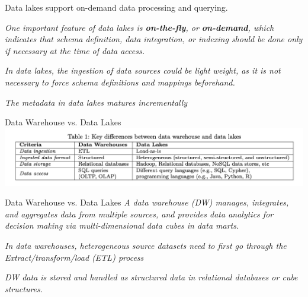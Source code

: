 \documentclass[xcolor=x11names,compress, 24pt]{beamer}
\renewcommand{\(}{\begin{columns}}
\renewcommand{\)}{\end{columns}}
\newcommand{\<}[1]{\begin{column}{#1}}
\renewcommand{\>}{\end{column}}
\begin{document}
 \begin{frame}{Data lakes support on-demand data processing and querying.}
	
	\emph{One important feature of data lakes is \textbf{on-the-fly}, or\textbf{ on-demand}, which indicates that schema definition, data integration, or indexing should be done only if necessary at the time of data access.} \vspace{.25cm}
	
	\emph{In data lakes, the ingestion of data sources could be light weight, as it is not necessary to force schema definitions and mappings beforehand.}\vspace{.25cm}
	
	\emph{The metadata in data lakes matures incrementally}\vspace{.25cm}
\end{frame}



\begin{frame}{Data Warehouse vs. Data Lakes}
 \includegraphics[scale=.4]{dw_data_lake}
\end{frame}


\begin{frame}{Data Warehouse vs. Data Lakes}
	\emph{A data warehouse (DW) manages, integrates, and aggregates data from multiple sources, and provides data analytics for decision making via multi-dimensional data cubes in data marts.} \vspace{.25cm}

\emph{In data warehouses, heterogeneous source datasets need to first go through the Extract/transform/load (ETL) process}\vspace{.25cm}

\emph{DW data is stored and handled as structured data in relational databases or cube structures.}\vspace{.25cm}
\end{frame}
\end{document}
